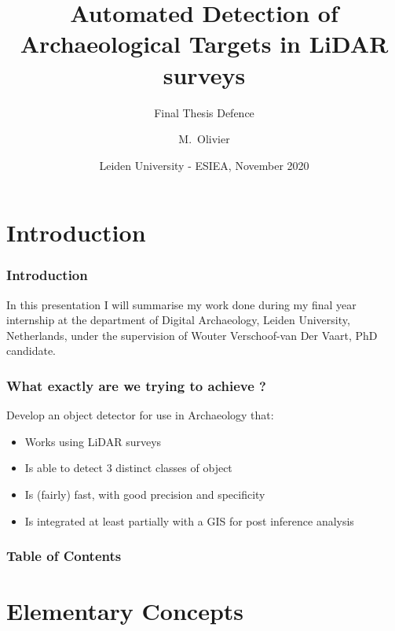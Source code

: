 \documentclass[aspectratio=169]{beamer}
\title[Automated Detection of Archaeological Targets in LiDAR surveys ] %
{Automated Detection of Archaeological Targets in LiDAR surveys}
\subtitle{Final Thesis Defence}
\author[Olivier] %
{M.~Olivier}
\date[3] %
		      {Leiden University - ESIEA, November 2020}
\begin{document}
\frame{\titlepage}

\section{Introduction}
\begin{frame}
	\frametitle{Introduction}
	In this presentation I will summarise my work done during my final year internship at the department of Digital Archaeology, Leiden University, Netherlands, under the supervision of Wouter Verschoof-van Der Vaart, PhD candidate.
\end{frame}

\begin{frame}
	\frametitle{What exactly are we trying to achieve ?}
	Develop an object detector for use in Archaeology that:
	\begin{itemize}
		\item Works using LiDAR surveys
		\item Is able to detect 3 distinct classes of object
		\item Is (fairly) fast, with good precision and specificity
		\item Is integrated at least partially with a GIS for post inference analysis 
	\end{itemize}
\end{frame}


\begin{frame}[allowframebreaks]
	\frametitle{Table of Contents}
	\tableofcontents
\end{frame}

\section{Elementary Concepts}
\end{document}
